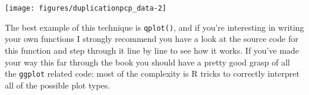 \begin{Shaded}
\begin{Highlighting}[]
\NormalTok{>}\StringTok{ }\StringTok{ }\NormalTok{(} 
\end{Highlighting}
\end{Shaded}

\begin{flushleft}\texttt{[image: figures/duplicationpcp\_data-2]} \end{flushleft}

The best example of this technique is \texttt{qplot()}, and if you're
interesting in writing your own functions I strongly recommend you have
a look at the source code for this function and step through it line by
line to see how it works. If you've made your way this far through the
book you should have a pretty good grasp of all the \texttt{ggplot}
related code: most of the complexity is R tricks to correctly interpret
all of the possible plot types.
